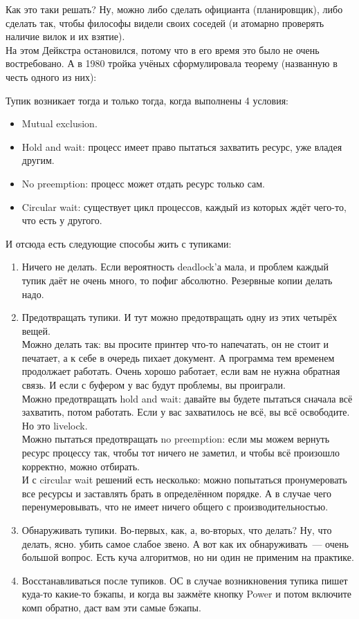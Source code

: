 \documentclass{article}
\begin{document}
    Как это таки решать? Ну, можно либо сделать официанта (планировщик), либо сделать так, чтобы философы видели своих соседей (и атомарно проверять наличие вилок и их взятие).\\
    На этом Дейкстра остановился, потому что в его время это было не очень востребовано. А в 1980 тройка учёных сформулировала теорему (названную в честь одного из них):
    \begin{theorem}
        Тупик возникает тогда и только тогда, когда выполнены 4 условия:
        \begin{itemize}
            \item Mutual exclusion.
            \item Hold and wait: процесс имеет право пытаться захватить ресурс, уже владея другим.
            \item No preemption: процесс может отдать ресурс только сам.
            \item Circular wait: существует цикл процессов, каждый из которых ждёт чего-то, что есть у другого.
        \end{itemize}
    \end{theorem}
    И отсюда есть следующие способы жить с тупиками:
    \begin{enumerate}
        \item Ничего не делать. Если вероятность deadlock'а мала, и проблем каждый тупик даёт не очень много, то пофиг абсолютно. Резервные копии делать надо.
        \item Предотвращать тупики. И тут можно предотвращать одну из этих четырёх вещей.\\
        Можно делать так: вы просите принтер что-то напечатать, он не стоит и печатает, а к себе в очередь пихает документ. А программа тем временем продолжает работать. Очень хорошо работает, если вам не нужна обратная связь. И если с буфером у вас будут проблемы, вы проиграли.\\
        Можно предотвращать hold and wait: давайте вы будете пытаться сначала всё захватить, потом работать. Если у вас захватилось не всё, вы всё освободите. Но это livelock.\\
        Можно пытаться предотвращать no preemption: если мы можем вернуть ресурс процессу так, чтобы тот ничего не заметил, и чтобы всё произошло корректно, можно отбирать.\\
        И с circular wait решений есть несколько: можно попытаться пронумеровать все ресурсы и заставлять брать в определённом порядке. А в случае чего перенумеровывать, что не имеет ничего общего с производительностью.
        \item Обнаруживать тупики. Во-первых, как, а, во-вторых, что делать? Ну, что делать, ясно. убить самое слабое звено. А вот как их обнаруживать~--- очень большой вопрос. Есть куча алгоритмов, но ни один не применим на практике.
        \item Восстанавливаться после тупиков. ОС в случае возникновения тупика пишет куда-то какие-то бэкапы, и когда вы зажмёте кнопку Power и потом включите комп обратно, даст вам эти самые бэкапы.
    \end{enumerate}
\end{document}
